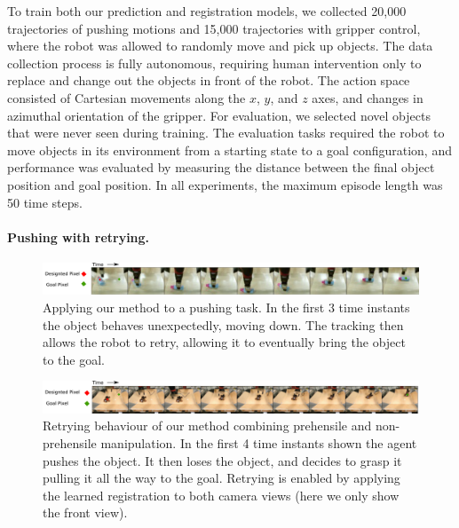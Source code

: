 To train both our prediction and registration models, we collected 20,000 trajectories of pushing motions and 15,000 trajectories with gripper control, where the robot was allowed to randomly move and pick up objects. The data collection process is fully autonomous, requiring human intervention only to replace and change out the objects in front of the robot.
The action space consisted of Cartesian movements along the $x$, $y$, and $z$ axes, and changes in azimuthal orientation of the gripper. For evaluation, we selected novel objects that were never seen during training. The evaluation tasks required the robot to move objects in its environment from a starting state to a goal configuration, and performance was evaluated by measuring the distance between the final object position and goal position. In all experiments, the maximum episode length was 50 time steps.

\vspace{-0.1in}
\paragraph{Pushing with retrying.}
\begin{figure}
    \centering
    \includegraphics[width=1.0\textwidth]{images/push_correction.pdf}
    \caption{\small{Applying our method to a pushing task. In the first 3 time instants the object behaves unexpectedly, moving down. The tracking then allows the robot to retry, allowing it to eventually bring the object to the goal.}}
    \label{fig:push_retry}
\end{figure}

\begin{figure}
\vspace{-0.1in}
    \centering
    \includegraphics[width=1.0\textwidth]{images/pick_place_plush.pdf}
    \caption{\small{Retrying behaviour of our method combining prehensile and non-prehensile manipulation. In the first 4 time instants shown the agent pushes the object. It then loses the object, and decides to grasp it pulling it all the way to the goal. Retrying is enabled by applying the learned registration to both camera views (here we only show the front view).}}
    \label{fig:discrete}
    \vspace{-0.2in}
\end{figure}

